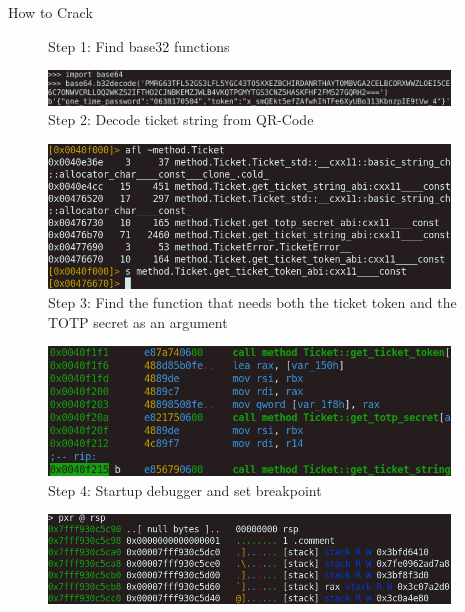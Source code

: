 \documentclass[final,dvipsnames]{beamer}
\newlength{\colwidth}
\begin{document}
\begin{frame}[t, fragile]
\begin{columns}[t]
\begin{column}{\colwidth}
\begin{block}{How to Crack}
\begin{figure}[h]
            \caption{Step 1: Find base32 functions}
            \label{fig:HackingStep1}
        \end{figure}
        \begin{figure}[h]
            \centering
            \includegraphics[width=0.95\textwidth]{../figures/Hacking_step_2.png}
            \caption{Step 2: Decode ticket string from QR-Code}
            \label{fig:HackingStep2}
        \end{figure}
        \begin{figure}[h]
            \centering
            \includegraphics[width=0.95\textwidth]{../figures/Hacking_step_3.png}
            \caption{Step 3: Find the function that needs both the ticket token and the TOTP secret as an argument}
            \label{fig:HackingStep3}
        \end{figure}
        \begin{figure}[h]
            \centering
            \includegraphics[width=0.95\textwidth]{../figures/Hacking_step_4.png}
            \caption{Step 4: Startup debugger and set breakpoint}
            \label{fig:HackingStep4}
        \end{figure}
        \begin{figure}[h]
            \centering
            \includegraphics[width=0.95\textwidth]{../figures/Hacking_step_5.png}

\end{figure}
\end{block}
\end{column}
\end{columns}
\end{frame}
\end{document}
